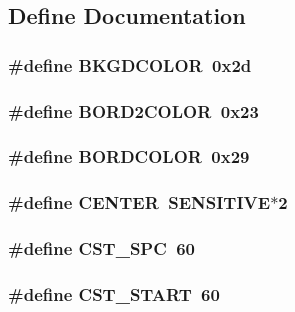 \subsection{Define Documentation}
\hypertarget{WL__MENU_8H_acdc23edcbef7544ed85ffc9baaf0f58e}{
\subsubsection[{BKGDCOLOR}]{\setlength{\rightskip}{0pt plus 5cm}\#define BKGDCOLOR~0x2d}}
\label{WL__MENU_8H_acdc23edcbef7544ed85ffc9baaf0f58e}
\hypertarget{WL__MENU_8H_afaff465652d15eca3b4aa4acde560e75}{
\subsubsection[{BORD2COLOR}]{\setlength{\rightskip}{0pt plus 5cm}\#define BORD2COLOR~0x23}}
\label{WL__MENU_8H_afaff465652d15eca3b4aa4acde560e75}
\hypertarget{WL__MENU_8H_a9f00281077534835a9a522d628ac15d7}{
\subsubsection[{BORDCOLOR}]{\setlength{\rightskip}{0pt plus 5cm}\#define BORDCOLOR~0x29}}
\label{WL__MENU_8H_a9f00281077534835a9a522d628ac15d7}
\hypertarget{WL__MENU_8H_a824fea1f256659e11e6cd8c82cb13338}{
\subsubsection[{CENTER}]{\setlength{\rightskip}{0pt plus 5cm}\#define CENTER~SENSITIVE$\ast$2}}
\label{WL__MENU_8H_a824fea1f256659e11e6cd8c82cb13338}
\hypertarget{WL__MENU_8H_a08b559e4021707910677ba5d7700e354}{
\subsubsection[{CST\_\-SPC}]{\setlength{\rightskip}{0pt plus 5cm}\#define CST\_\-SPC~60}}
\label{WL__MENU_8H_a08b559e4021707910677ba5d7700e354}
\hypertarget{WL__MENU_8H_a750f59be9efaeb9416f671951f66d16d}{
\subsubsection[{CST\_\-START}]{\setlength{\rightskip}{0pt plus 5cm}\#define CST\_\-START~60}}
